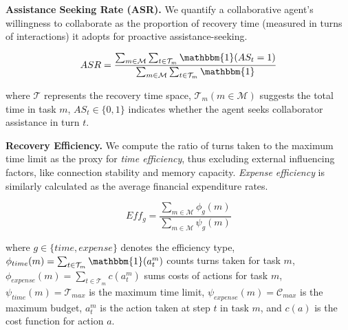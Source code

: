 


\textbf{Assistance Seeking Rate (ASR).}
We quantify a collaborative agent's willingness to collaborate as the proportion of recovery time (measured in turns of interactions) it adopts for proactive assistance-seeking.

{
\vspace{-1em}
\small
\begin{equation}
ASR = \frac{\sum_{m \in \mathcal{M}} \sum_{t \in \mathcal{T}_m} \mathbbm{1}(AS_t = 1)}{\sum_{m \in \mathcal{M}} \sum_{t \in \mathcal{T}_m} \mathbbm{1}}
\label{Eq: Evaluation Metric 4 (ASR)}
\end{equation}
\vspace{-2em}
}

{\small
where $\mathcal{T}$ represents the recovery time space, $\mathcal{T}_m (m \in \mathcal{M})$ suggests the total time in task $m$, $AS_t \in \{0,1\}$ indicates whether the agent seeks collaborator assistance in turn $t$.
}



\textbf{Recovery Efficiency.}
We compute the ratio of turns taken to the maximum time limit as the proxy for \textit{time efficiency}, thus excluding external influencing factors, like connection stability and memory capacity. \textit{Expense efficiency} is similarly calculated as the average financial expenditure rates.

{
\vspace{-1em}
\small
\begin{equation}
Eff_g = \frac{\sum_{m \in \mathcal{M}} \phi_g(m)}{\sum_{m \in \mathcal{M}} \psi_g(m)}
\label{Eq: Evaluation Metric 5 (Efficiency)}
\end{equation}
\vspace{-1.8em}
}

{\small
where $g \in \{time, expense\}$ denotes the efficiency type,
$\phi_{time}(m)=\sum_{t \in \mathcal{T}_m} \mathbbm{1}(a_t^m)$ counts turns taken for task $m$,
$\phi_{expense}(m)=\sum_{t \in \mathcal{T}_m} c(a_t^m)$ sums costs of actions for task $m$,
$\psi_{time}(m) = \mathcal{T}_{max}$ is the maximum time limit,
$\psi_{expense}(m) = \mathcal{C}_{max}$ is the maximum budget,
$a_t^m$ is the action taken at step $t$ in task $m$,
and $c(a)$ is the cost function for action $a$.
}

